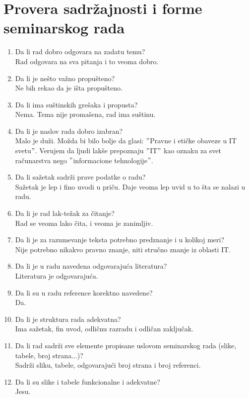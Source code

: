 \documentclass[a4paper]{article}
\begin{document}
\section{Provera sadržajnosti i forme seminarskog rada}

\begin{enumerate}
\item Da li rad dobro odgovara na zadatu temu?\\ Rad odgovara na sva pitanja i to veoma dobro.
\item Da li je nešto važno propušteno?\\ Ne bih rekao da je išta propušteno.
\item Da li ima suštinskih grešaka i propusta?\\ Nema. Tema nije promašena, rad ima suštinu.
\item Da li je naslov rada dobro izabran?\\ Malo je duži. Možda bi bilo bolje da glasi: $"$Pravne i etičke obaveze u IT svetu$"$. Verujem da ljudi lakše prepoznaju $"$IT$"$ kao oznaku za svet računarstva nego $"$informacione tehnologije$"$.
\item Da li sažetak sadrži prave podatke o radu?\\ Sažetak je lep i fino uvodi u priču. Daje veoma lep uvid u to šta se nalazi u radu.
\item Da li je rad lak-težak za čitanje?\\ Rad se veoma lako čita, i veoma je zanimljiv.
\item Da li je za razumevanje teksta potrebno predznanje i u kolikoj meri?\\ Nije potrebno nikakvo pravno znanje, niti stručno znanje iz oblasti IT.
\item Da li je u radu navedena odgovarajuća literatura?\\ Literatura je odgovarajuća.
\item Da li su u radu reference korektno navedene?\\ Da.
\item Da li je struktura rada adekvatna?\\ Ima sažetak, fin uvod, odličnu razradu i odličan zaključak.
\item Da li rad sadrži sve elemente propisane uslovom seminarskog rada (slike, tabele, broj strana...)?\\ Sadrži sliku, tabele, odgovarajući broj strana i broj referenci.
\item Da li su slike i tabele funkcionalne i adekvatne?\\ Jesu.
\end{enumerate}
\end{document}
